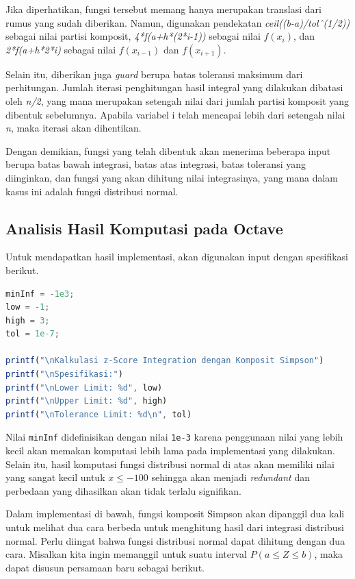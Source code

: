 \documentclass[journal,12pt,onecolumn,a4paper]{IEEEtran}
\begin{document}
Jika diperhatikan, fungsi tersebut memang hanya merupakan translasi dari rumus yang sudah diberikan. Namun, digunakan pendekatan \emph{ceil((b-a)/tolˆ(1/2))} sebagai nilai partisi komposit, \emph{4*f(a+h*(2*i-1))} sebagai nilai \(f(x_{i})\), dan  \emph{2*f(a+h*2*i)} sebagai nilai \(f(x_{i-1})\) dan \(f(x_{i+1})\).

Selain itu, diberikan juga \emph{guard} berupa batas toleransi maksimum dari perhitungan. Jumlah iterasi penghitungan hasil integral yang dilakukan dibatasi oleh \emph{n/2}, yang mana merupakan setengah nilai dari jumlah partisi komposit yang dibentuk sebelumnya. Apabila variabel i telah mencapai lebih dari setengah nilai \emph{n}, maka iterasi akan dihentikan.

Dengan demikian, fungsi yang telah dibentuk akan menerima beberapa input berupa batas bawah integrasi, batas atas integrasi, batas toleransi yang diinginkan, dan fungsi yang akan dihitung nilai integrasinya, yang mana dalam kasus ini adalah fungsi distribusi normal.

\subsection{Analisis Hasil Komputasi pada Octave}

Untuk mendapatkan hasil implementasi, akan digunakan input dengan spesifikasi berikut.

\begin{center}
	\begin{lstlisting}[language=Octave]
minInf = -1e3;
low = -1;
high = 3;
tol = 1e-7;
		
printf("\nKalkulasi z-Score Integration dengan Komposit Simpson")
printf("\nSpesifikasi:")
printf("\nLower Limit: %d", low)
printf("\nUpper Limit: %d", high)
printf("\nTolerance Limit: %d\n", tol)
	\end{lstlisting}
\end{center}

Nilai \lstinline{minInf} didefinisikan dengan nilai \lstinline{1e-3} karena penggunaan nilai yang lebih kecil akan memakan komputasi lebih lama pada implementasi yang dilakukan. Selain itu, hasil komputasi fungsi distribusi normal di atas akan memiliki nilai yang sangat kecil untuk \(x \le -100\) sehingga akan menjadi \emph{redundant} dan perbedaan yang dihasilkan akan tidak terlalu signifikan.

Dalam implementasi di bawah, fungsi komposit Simpson akan dipanggil dua kali untuk melihat dua cara berbeda untuk menghitung hasil dari integrasi distribusi normal. Perlu diingat bahwa fungsi distribusi normal dapat dihitung dengan dua cara. Misalkan kita ingin memanggil untuk suatu interval \(P(a \le Z \le b)\), maka dapat disusun persamaan baru sebagai berikut.
\end{document}
